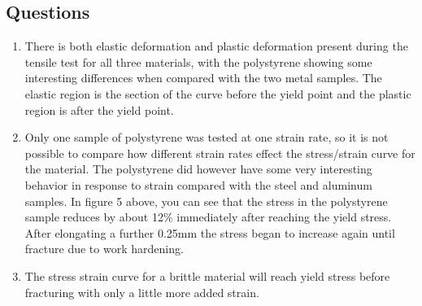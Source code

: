 \documentclass{article}
\begin{document}
\subsection*{Questions}
\begin{enumerate}
\item There is both elastic deformation and plastic deformation present during the tensile test for all three materials, with the polystyrene showing some interesting differences when compared with the two metal samples. The elastic region is the section of the curve before the yield point and the plastic region is after the yield point.

\item Only one sample of polystyrene was tested at one strain rate, so it is not possible to compare how different strain rates effect the stress/strain curve for the material. The polystyrene did however have some very interesting behavior in response to strain compared with the steel and aluminum samples. In figure 5 above, you can see that the stress in the polystyrene sample reduces by about 12\% immediately after reaching the yield stress. After elongating a further 0.25\si{mm} the stress began to increase again until fracture due to work hardening.

\item The stress strain curve for a brittle material will reach yield stress before fracturing with only a little more added strain.
\end{enumerate}
\end{document}
